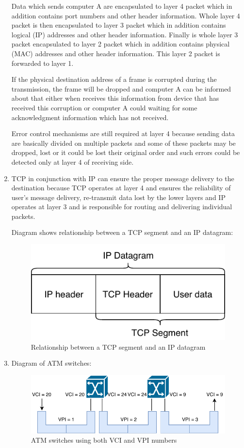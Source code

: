 \documentclass[a4paper, 11pt]{article}
\begin{document}
\begin{enumerate}
			Data which sends computer A are encapsulated to layer 4 packet which in addition contains port
			numbers and other header information. Whole layer 4 packet is then encapsulated to layer 3 packet
			which in addition contains logical (IP) addresses and other header information. Finally is whole
			layer 3 packet encapsulated to layer 2 packet which in addition contains physical (MAC) addresses
			and other header information. This layer 2 packet is forwarded to layer 1.

			If the physical destination address of a frame is corrupted during the transmission, the frame will
			be dropped and computer A can be informed about that either when receives this information from device
			that has received this corruption or computer A could waiting for some acknowledgment information which
			has not received.

			Error control mechanisms are still required at layer 4 because sending data are basically divided on
			multiple packets and some of these packets may be dropped, lost or it could be lost their original order
			and such errors could be detected only at layer 4 of receiving side.

		\item %
			TCP in conjunction with IP can ensure the proper message delivery to the destination because TCP operates
			at layer 4 and ensures the reliability of user's message delivery, re-transmit data lost by the lower
			layers and IP operates at layer 3 and is responsible for routing and delivering individual packets.

			Diagram shows relationship between a TCP segment and an IP datagram:
			\begin{figure}[H]
				\centering
				\includegraphics[width=0.4\linewidth]{inc/tcp_ip_relation.pdf}
				\caption{Relationship between a TCP segment and an IP datagram}
				\label{figure:tcp_ip_relation}
			\end{figure}

		\item %
			Diagram of ATM switches:
			\begin{figure}[H]
				\centering
				\includegraphics[width=0.7\linewidth]{inc/atm_switch.pdf}
				\caption{ATM switches using both VCI and VPI numbers}
				\label{figure:atm_switch}
			\end{figure}


\end{enumerate}
\end{document}
